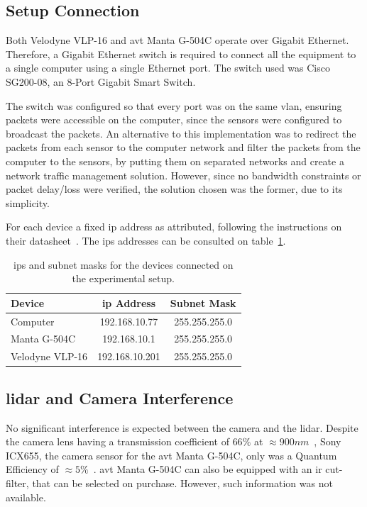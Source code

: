 \subsection{Setup Connection} 
Both Velodyne VLP-16 and \ac{avt} Manta G-504C operate over Gigabit Ethernet. Therefore, a Gigabit  Ethernet switch is required to connect all the equipment to a single computer using a single Ethernet port. The switch used was Cisco SG200-08, an 8-Port Gigabit Smart Switch. 

The switch was configured so that every port was on the same \ac{vlan}, ensuring packets were accessible on the computer, since the sensors were configured to broadcast the packets. An alternative to this implementation was to redirect the packets from each sensor to the computer network and filter the packets from the computer to the sensors, by putting them on separated networks and create a network traffic management solution. However, since no bandwidth constraints or packet delay/loss were verified, the solution chosen was the former, due to its simplicity. 

For each device a fixed \acf{ip} address as attributed, following the instructions on their datasheet~\cite{VLP16, MantaVision2013}. The \acp{ip} addresses can be consulted on table~\ref{tab:experimental-setup-ip}.

\begin{table}[H]
	\renewcommand{\arraystretch}{1.2}
	\centering
	\begin{tabular}{@{}lcc@{}}
		\toprule
		Device          & \ac{ip} Address & Subnet Mask\\ \midrule
		Computer        & 192.168.10.77  & 255.255.255.0 \\
		Manta G-504C    & 192.168.10.1   & 255.255.255.0 \\
		Velodyne VLP-16 & 192.168.10.201 & 255.255.255.0 \\
		\bottomrule
	\end{tabular}
	\caption{\acp{ip} and subnet masks for the devices connected on the experimental setup.}
	\label{tab:experimental-setup-ip}
\end{table}

\subsection{\ac{lidar} and Camera Interference}
No significant interference is expected between the camera and the \ac{lidar}. Despite the camera lens having a transmission coefficient of $66\%$ at $\approx 900 nm$~\cite{Thorlabs}, Sony ICX655, the camera sensor for the \ac{avt} Manta G-504C, only was a Quantum Efficiency of $\approx 5\%$~\cite{MantaG504C}. \ac{avt} Manta G-504C can also be equipped with an \ac{ir} cut-filter, that can be selected on purchase. However, such information was not available.

